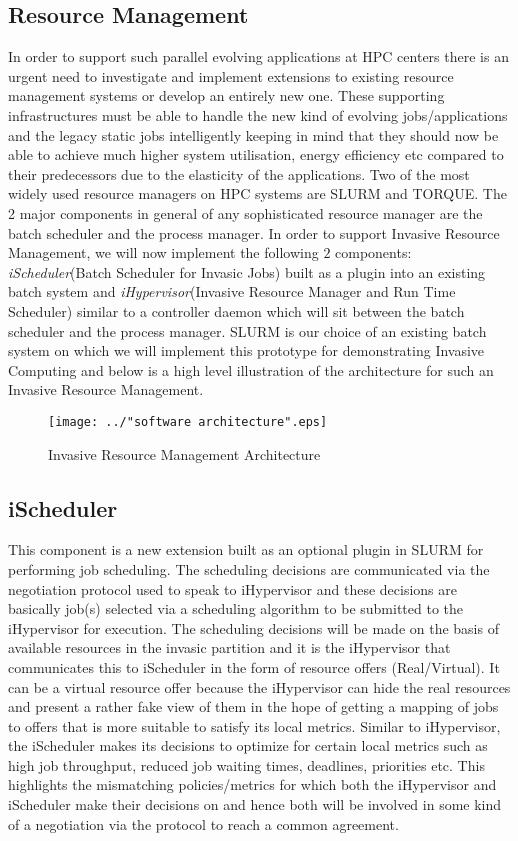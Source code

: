 \documentclass{article}
\begin{document}
\subsection{Resource Management}
In order to support such parallel evolving applications at HPC centers there is an urgent need to investigate and implement extensions to existing resource management systems or develop an entirely new one. These supporting infrastructures must be able to handle the new kind of evolving jobs/applications and the legacy static jobs intelligently keeping in mind that they should now be able to achieve much higher system utilisation, energy efficiency etc compared to their predecessors due to the elasticity of the applications. Two of the most widely used resource managers on HPC systems are SLURM and TORQUE. The 2 major components in general of any sophisticated resource manager are the batch scheduler and the process manager. In order to support Invasive Resource Management, we will now implement the following $2$ components: \textit{iScheduler}(Batch Scheduler for Invasic Jobs) built as a plugin into an existing batch system and \textit{iHypervisor}(Invasive Resource Manager and Run Time Scheduler) similar to a controller daemon which will sit between the batch scheduler and the process manager. SLURM is our choice of an existing batch system on which we will implement this prototype for demonstrating Invasive Computing and below is a high level illustration of the architecture for such an Invasive Resource Management.\par
\begin{figure}[!htbp]
\centering
\texttt{[image: ../"software architecture".eps]}
\caption{Invasive Resource Management Architecture}
\label{fig:1}
\end{figure}
\clearpage
\subsection{iScheduler}
This component is a new extension built as an optional plugin in SLURM for performing job scheduling. The scheduling decisions are communicated via the negotiation protocol used to speak to iHypervisor and these decisions are basically job(s) selected via a scheduling algorithm to be
submitted to the iHypervisor for execution. The scheduling decisions will be made on the basis of available resources in the invasic partition and it is the iHypervisor that communicates this to iScheduler in the form of resource offers (Real/Virtual). It can be a virtual resource offer because the iHypervisor can hide the real resources and present a rather fake view of them in the hope of getting a mapping of jobs to offers that is more suitable to satisfy its local metrics. Similar to iHypervisor, the iScheduler makes its decisions to optimize for certain local metrics such as high job throughput, reduced job waiting times, deadlines, priorities etc. This highlights the mismatching policies/metrics for which both the iHypervisor and iScheduler make their decisions on and hence both will be involved in some kind of a negotiation via the protocol to reach a common agreement.\par
\end{document}
